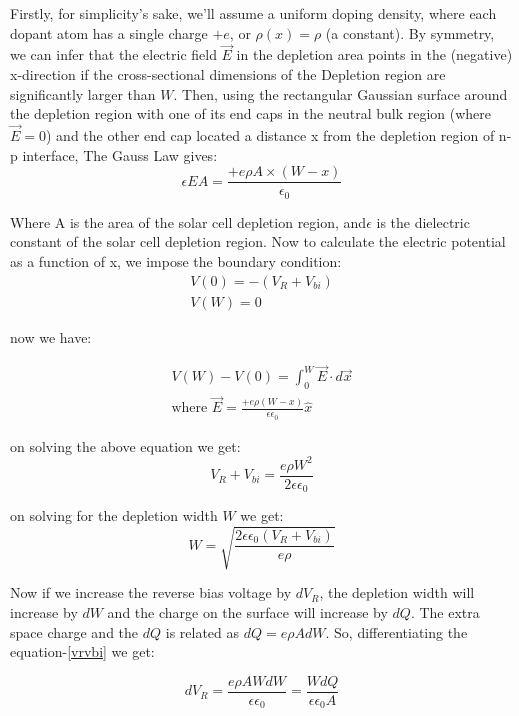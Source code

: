 \documentclass{article}
\begin{document}
\begin{multicols}{2}
Firstly, for simplicity's sake, we'll assume a uniform doping density, where each dopant atom has a single charge $+e$, or $\rho(x) = \rho$ (a constant). By symmetry, we can infer that the electric field $\vec{E}$ in the depletion area points in the (negative) x-direction if the cross-sectional dimensions of the Depletion region are significantly larger than $W$. Then, using the rectangular Gaussian surface around the depletion region with one of its end caps in the neutral bulk region (where $\vec{E} = $0) and the other end cap located a distance x from the depletion region of n-p interface, The Gauss Law gives:
\begin{equation}
    \epsilon E A = \frac{+e \rho A \times (W-x)}{\epsilon_0}
\end{equation}


Where A is the area of the solar cell depletion region, and$\epsilon$ is the dielectric constant of the solar cell depletion region. Now to calculate the electric potential as a function of x, we impose
the boundary condition:
\begin{eqnarray}
    V(0) = -(V_R + V_{bi}) \\
    V(W) = 0
\end{eqnarray}


now we have:

\begin{eqnarray}
    V(W) - V(0) = \int_{0}^{W}  \vec{E} \cdot d\vec{x} \\
    \text{where } \vec{E} = \frac{+e \rho(W-x)}{\epsilon \epsilon_0} \hat{x}
\end{eqnarray}

on solving the above equation we get:
\begin{equation}
    V_R + V_{bi} = \frac{e \rho W^2}{2 \epsilon \epsilon_0}
    \label{vrvbi}
\end{equation}



on solving for the depletion width $W$ we get:
\begin{equation}
    W = \sqrt{\frac{2 \epsilon \epsilon_0 (V_R + V_{bi})}{e \rho}}
    \label{W}
\end{equation}


Now if we increase the reverse bias voltage by $dV_R$, 
the depletion width will
increase by $dW$ and the charge on the surface will increase 
by $dQ$. The extra space charge
and the $dQ$ is related as $dQ = e\rho A dW$. So, 
differentiating the equation-\ref{vrvbi} we get:

\begin{equation}
    dV_R = \frac{e \rho A WdW}{\epsilon \epsilon_0} = \frac{WdQ}{\epsilon \epsilon_0 A}
\end{equation}


\end{multicols}
\end{document}
